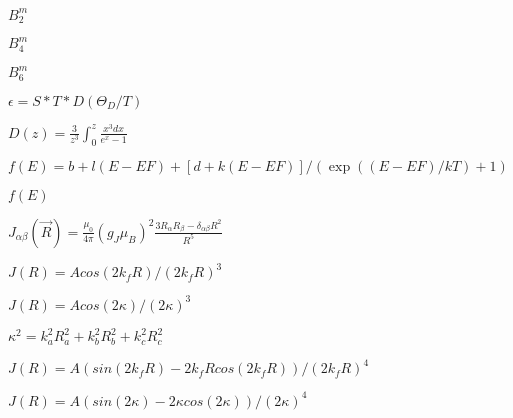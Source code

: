 \documentclass[twoside]{article}
\def\lthtmlcheckvsize{\ifdim\ht\sizebox<\vsize 
  \ifdim\wd\sizebox<\hsize\expandafter\hfill\fi \expandafter\vfill
  \else\expandafter\vss\fi}%
\begin{document}
{\newpage\clearpage
{}%
$B_2^m$%
\lthtmlindisplaymathZ
\lthtmlcheckvsize\clearpage}

{\newpage\clearpage
{}%
$ B_4^m$%
\lthtmlindisplaymathZ
\lthtmlcheckvsize\clearpage}

{\newpage\clearpage
{}%
$B_6^m$%
\lthtmlindisplaymathZ
\lthtmlcheckvsize\clearpage}

{\newpage\clearpage
{}%
$   \epsilon=S*T*D(\Theta_{D}/T) $%
\lthtmlindisplaymathZ
\lthtmlcheckvsize\clearpage}

{\newpage\clearpage
{}%
$D(z)=\frac{3}{z^3}\int_0^z \frac{x^3 dx}{e^x-1}$%
\lthtmlindisplaymathZ
\lthtmlcheckvsize\clearpage}

{\newpage\clearpage
{}%
$ f(E)=b+l(E-EF)+[d+k(E-EF)]/(\exp((E-EF)/kT)+1)$%
\lthtmlindisplaymathZ
\lthtmlcheckvsize\clearpage}

{\newpage\clearpage
{}%
$ f(E)$%
\lthtmlindisplaymathZ
\lthtmlcheckvsize\clearpage}

{\newpage\clearpage
{}%
$J_{\alpha\beta}(\vec R)=\frac{\mu_0}{4\pi} (g_J \mu_B)^2 \frac{3R_{\alpha}R_{\beta}-\delta_{\alpha\beta}R^2}{R^5}$%
\lthtmlindisplaymathZ
\lthtmlcheckvsize\clearpage}

{\newpage\clearpage
{}%
$J(R)=A %
cos(2 k_f R)/(2 k_f R)^3$%
\lthtmlindisplaymathZ
\lthtmlcheckvsize\clearpage}

{\newpage\clearpage
{}%
$J(R)=A cos(2 \kappa)/(2 \kappa)^3$%
\lthtmlindisplaymathZ
\lthtmlcheckvsize\clearpage}

{\newpage\clearpage
{}%
$\kappa^2=k_a^2 R_a^2 + k_b^2 R_b^2 + %
k_c^2 R_c^2$%
\lthtmlindisplaymathZ
\lthtmlcheckvsize\clearpage}

{\newpage\clearpage
{}%
$J(R)=A %
(sin(2 k_f R)- 2 k_f R cos(2 k_f R))/(2 k_f R)^4$%
\lthtmlindisplaymathZ
\lthtmlcheckvsize\clearpage}

{\newpage\clearpage
{}%
$J(R)=A (sin(2 \kappa)- 2 \kappa cos(2 \kappa))/(2 \kappa)^4$%
\lthtmlindisplaymathZ
\lthtmlcheckvsize\clearpage}
\end{document}

